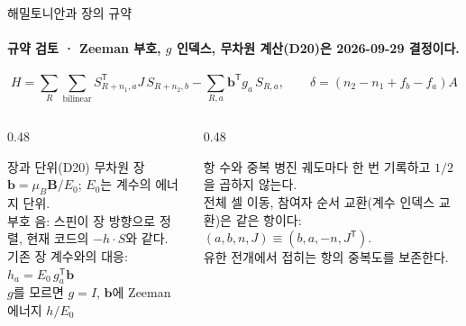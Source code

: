 \begin{frame}[label=hamiltonian-convention]{해밀토니안과 장의 규약}
  \framesubtitle{규약 검토 · Zeeman 부호, $g$ 인덱스, 무차원 계산(D20)은 2026-09-29 결정이다.}
  \[
    H=\sum_{R}\sum_{\mathrm{bilinear}} S_{R+n_1,a}^{\mathsf T}J\,S_{R+n_2,b}
      -\sum_{R,a}\mathbf b^{\mathsf T}g_a\,S_{R,a},
    \qquad \delta=(n_2-n_1+f_b-f_a)A
  \]
  \begin{columns}[T,onlytextwidth]
    \begin{column}{0.48\textwidth}
      \begin{block}{장과 단위(D20)}
        무차원 장 $\mathbf b=\mu_B\mathbf B/E_0$; $E_0$는 계수의 에너지 단위.\\[0.4em]
        부호 음: 스핀이 장 방향으로 정렬, 현재 코드의 $-h\cdot S$와 같다.\\[0.4em]
        기존 장 계수와의 대응: $h_a=E_0\,g_a^{\mathsf T}\mathbf b$\\[0.4em]
        $g$를 모르면 $g=I$, $\mathbf b$에 Zeeman 에너지 $h/E_0$
      \end{block}
    \end{column}
    \begin{column}{0.48\textwidth}
      \begin{block}{항 수와 중복}
        병진 궤도마다 한 번 기록하고 $1/2$을 곱하지 않는다.\\[0.4em]
        전체 셀 이동, 참여자 순서 교환(계수 인덱스 교환)은 같은 항이다:
        $(a,b,n,J)\equiv(b,a,-n,J^{\mathsf T})$.\\[0.4em]
        유한 전개에서 접히는 항의 중복도를 보존한다.
      \end{block}
    \end{column}
  \end{columns}
\end{frame}

